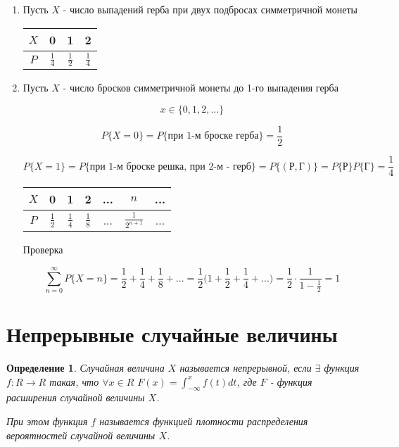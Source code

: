 \documentclass[a4paper, 14pt]{report}
\newtheorem{defenition}{Определение}[chapter]
\begin{document}
\begin{enumerate}
    \item Пусть $X$ - число выпадений герба при двух подбросах симметричной монеты

        \begin{tabular}{|c||c|c|c|}
                \hline
                $X$ & 0 & 1 & 2 \\
                \hline
                $P$ & $\frac{1}{4}$ & $\frac{1}{2}$ & $\frac{1}{4}$  \\
                \hline
        \end{tabular}

    \item Пусть $X$ - число бросков симметричной монеты до 1-го выпадения герба

        $$
        x \in \{0,1,2,...\}
        $$

        $$
        P\{X=0\} = P\{\text{при 1-м броске герба}\} = \frac{1}{2}
        $$

        $$
        P\{X=1\} = P\{\text{при 1-м броске решка, при 2-м - герб}\} = P\{(\text{Р},\text{Г})\} = P\{\text{Р}\} P\{\text{Г}\} = \frac{1}{4}
        $$

        \begin{tabular}{|c||c|c|c|c|c|c}
                \hline
                $X$ & 0 & 1 & 2 & ... & $n$ & ... \\
                \hline
                $P$ & $\frac{1}{2}$ & $\frac{1}{4}$ & $\frac{1}{8}$ & ... & $\frac{1}{2^{n+1}}$ & ...  \\
                \hline
        \end{tabular}

        Проверка

        $$
        \sum_{n=0}^\infty P\{X=n\} = \frac{1}{2} + \frac{1}{4} + \frac{1}{8} + ... = \frac{1}{2} \bigg(1 + \frac{1}{2} + \frac{1}{4} + ...\bigg) = \frac{1}{2} \cdot \frac{1}{1 - \frac{1}{2}} = 1
        $$

\end{enumerate}

\section{Непрерывные случайные величины}

\begin{defenition}
    Случайная величина $X$ называется непрерывной, если $\exists$ функция $f : R \to R$ такая,
    что $\forall x \in R$ $F(x) = \int_{-\infty}^x f(t) dt$, где $F$ - функция расширения случайной величины $X$.

    При этом функция $f$ называется функцией плотности распределения вероятностей случайной величины $X$.
\end{defenition}
\end{document}
